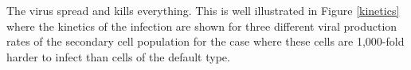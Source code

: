 \documentclass[grad,lot,lof,11pt,oneside,onehalfspace]{RUthesis}
\begin{document}
The virus spread and kills everything. This is well illustrated in Figure \ref{kinetics} where the kinetics of the infection are shown for three different viral production rates of the secondary cell population for the case where these cells are 1,000-fold harder to infect than cells of the default type. 
\begin{figure}
\begin{center}

\end{center}
\end{figure}
\end{document}
